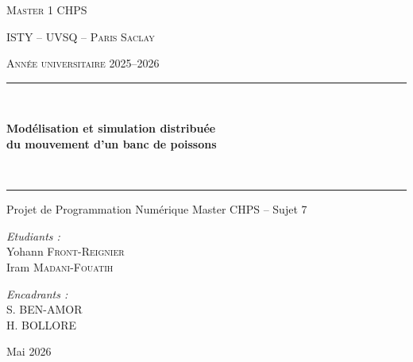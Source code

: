 \documentclass[conference]{IEEEtran}
\begin{document}



\begin{titlepage}
	\centering

	{\scshape\Large Master 1 CHPS \par}
	{\scshape\large ISTY -- UVSQ -- Paris Saclay \par}
	{\scshape\large Année universitaire 2025--2026 \par}

	\vspace{1.5cm}

	\rule{\linewidth}{0.5mm} \\[0.4cm]
	{\huge \bfseries Modélisation et simulation distribuée\\
	du mouvement d'un banc de poissons \par}
	\\[0.4cm]
	\rule{\linewidth}{0.5mm}

	\vspace{1.5cm}

	{\large Projet de Programmation Numérique Master CHPS -- Sujet 7 \par}

	\vspace{2cm}

	\begin{minipage}{0.45\textwidth}
		\begin{flushleft} \large
			\emph{Etudiants :} \\
			Yohann \textsc{Front-Reignier} \\
			Iram \textsc{Madani-Fouatih}
		\end{flushleft}
	\end{minipage}
	\hfill
	\begin{minipage}{0.45\textwidth}
		\begin{flushright} \large
			\emph{Encadrants :} \\
			S. \textsc{BEN-AMOR}\\
			H. \textsc{BOLLORE}

		\end{flushright}
	\end{minipage}

	\vfill

	{\large Mai 2026 \par}

\end{titlepage}
\end{document}
